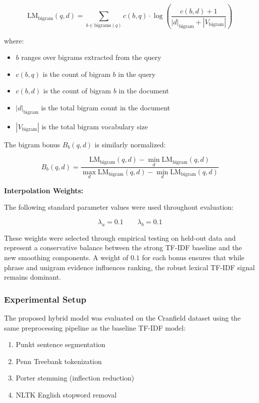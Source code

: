 \[
\text{LM}_{\text{bigram}}(q,d) = \sum_{b \in \text{bigrams}(q)} c(b,q) \cdot \log\left(\frac{c(b,d) + 1}{|d|_{\text{bigram}} + |V_{\text{bigram}}|}\right)
\]

where:
\begin{itemize}
    \item $b$ ranges over bigrams extracted from the query
    \item $c(b,q)$ is the count of bigram $b$ in the query
    \item $c(b,d)$ is the count of bigram $b$ in the document
    \item $|d|_{\text{bigram}}$ is the total bigram count in the document
    \item $|V_{\text{bigram}}|$ is the total bigram vocabulary size
\end{itemize}

The bigram bonus $B_b(q,d)$ is similarly normalized:

\[
B_b(q,d) = \frac{\text{LM}_{\text{bigram}}(q,d) - \min_d \text{LM}_{\text{bigram}}(q,d)}{\max_d \text{LM}_{\text{bigram}}(q,d) - \min_d \text{LM}_{\text{bigram}}(q,d)}
\]

\vspace{0.3cm}

\textbf{Interpolation Weights:}

The following standard parameter values were used throughout evaluation:

\[
\lambda_u = 0.1
\qquad
\lambda_b = 0.1
\]

These weights were selected through empirical testing on held-out data and represent a conservative balance between the strong TF-IDF baseline and the new smoothing components. A weight of $0.1$ for each bonus ensures that while phrase and unigram evidence influences ranking, the robust lexical TF-IDF signal remains dominant.

\vspace{0.3cm}

\subsubsection{Experimental Setup}

The proposed hybrid model was evaluated on the Cranfield dataset using the same preprocessing pipeline as the baseline TF-IDF model:

\begin{enumerate}
    \item Punkt sentence segmentation
    \item Penn Treebank tokenization  
    \item Porter stemming (inflection reduction)
    \item NLTK English stopword removal
\end{enumerate}

